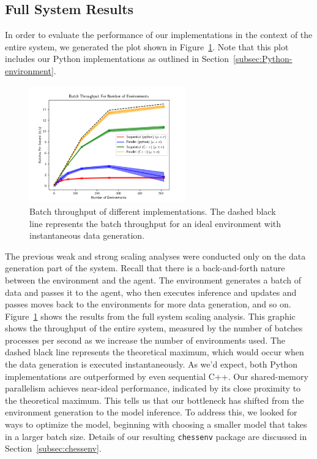\documentclass[12pt]{article}
\begin{document}
\subsection{Full System Results}\label{subsec:full-system-results}

In order to evaluate the performance of our implementations in the context of the entire system, we generated the plot shown in Figure~\ref{fig:batch_throughput}. Note that this plot includes our Python implementations as outlined in Section~\ref{subsec:Python-environment}.

\begin{figure}[H]
    \centering
    \includegraphics[width=0.6\textwidth]{plots/batch_throughput.png}
    \caption{Batch throughput of different implementations. The dashed black line represents the batch throughput for an ideal environment with instantaneous data generation.}
    \label{fig:batch_throughput}
\end{figure}

The previous weak and strong scaling analyses were conducted only on the data generation part of the system. Recall that there is a back-and-forth nature between the environment and the agent. The environment generates a batch of data and passes it to the agent, who then executes inference and updates and passes moves back to the environments for more data generation, and so on. Figure~\ref{fig:batch_throughput} shows the results from the full system scaling analysis. This graphic shows the throughput of the entire system, measured by the number of batches processes per second as we increase the number of environments used. The dashed black line represents the theoretical maximum, which would occur when the data generation is executed instantaneously. As we'd expect, both Python implementations are outperformed by even sequential C++. Our shared-memory parallelism achieves near-ideal performance, indicated by its close proximity to the theoretical maximum. This tells us that our bottleneck has shifted from the environment generation to the model inference. To address this, we looked for ways to optimize the model, beginning with choosing a smaller model that takes in a larger batch size. Details of our resulting \texttt{chessenv} package are discussed in Section~\ref{subsec:chessenv}.
\end{document}
